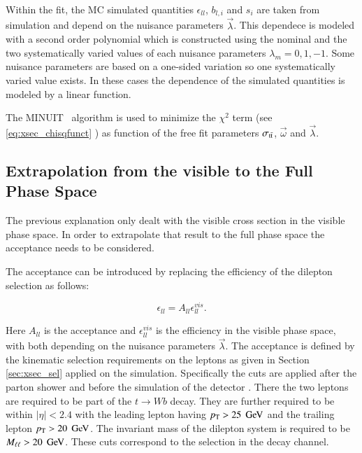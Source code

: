 Within the fit, the MC simulated quantities $\epsilon_{ll}$, $b_{l,i}$ and $s_{i}$ are taken from simulation and depend on the nuisance parameters $\vec{\lambda}$.
This dependece is modeled with a second order polynomial which is constructed using the nominal and the two systematically varied values of each nuisance parameters $\lambda_m=0,1,-1$.
Some nuisance parameters are based on a one-sided variation so one systematically varied value exists. In these cases the dependence of the simulated quantities is modeled by a linear function.

The MINUIT~\cite{James:1975dr} algorithm is used to minimize the  $\chi^2$ term (see \ref{eq:xsec_chisqfunct} ) as function of the free fit parameters $\sigma_\mathrm{t\bar{t}}$, $\vec{\omega}$
and $\vec{\lambda}$. 



\subsection{Extrapolation from the visible to the Full Phase Space}
\label{sec:xsec_extraction}

The previous explanation only dealt with the visible cross section in the visible phase space. In order to extrapolate that result to the full phase space the acceptance
needs to be considered.

The acceptance can be introduced by replacing the efficiency of the dilepton selection as follows:

\begin{equation}
\epsilon_{ll} = A_{ll} \epsilon^{vis}_{ll}.
\label{eq:epsacc}
\end{equation}

Here $A_{ll}$ is the acceptance and $\epsilon^{vis}_{ll}$ is the efficiency in the visible phase space, with both depending on the nuisance parameters $\vec{\lambda}$.
The acceptance is defined by the kinematic selection requirements on the leptons as given in Section \ref{sec:xsec_sel} applied on the simulation. Specifically the cuts are applied after the parton shower and before the simulation of the detector . There the two leptons are required to be part of the $t \rightarrow W b$ decay. They are further required to be within $|\eta|< 2.4$ with the 
leading lepton having $p_{\mathrm{T}} > 25 \; \,\text{Ge\hspace{-.08em}V}$ and the trailing lepton $p_{\mathrm{T}} > 20 \; \,\text{Ge\hspace{-.08em}V}$. The invariant mass of the dilepton system is required to be $M_{\ell\ell} > 20 \; \,\text{Ge\hspace{-.08em}V}$.
These cuts correspond to the selection in the \emu decay channel.

